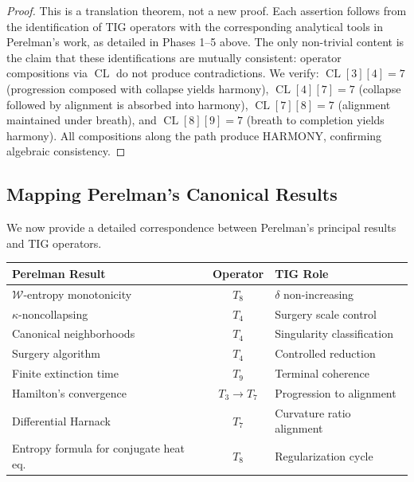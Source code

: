 \documentclass[11pt]{article}
\DeclareMathOperator{\CL}{CL}
\begin{document}
\begin{proof}
This is a translation theorem, not a new proof.  Each assertion
follows from the identification of TIG operators with the corresponding
analytical tools in Perelman's work, as detailed in
Phases 1--5 above.  The only non-trivial content is the claim that
these identifications are mutually consistent: operator compositions
via $\CL$ do not produce contradictions.  We verify:
$\CL[3][4] = 7$ (progression composed with collapse yields harmony),
$\CL[4][7] = 7$ (collapse followed by alignment is absorbed into
harmony), $\CL[7][8] = 7$ (alignment maintained under breath), and
$\CL[8][9] = 7$ (breath to completion yields harmony).  All
compositions along the path produce HARMONY, confirming algebraic
consistency.
\end{proof}

\subsection{Mapping Perelman's Canonical Results}
\label{subsec:poinc-mapping}

We now provide a detailed correspondence between Perelman's principal
results and TIG operators.

\begin{center}
\begin{tabular}{@{}p{5.5cm}cl@{}}
\toprule
Perelman Result & Operator & TIG Role \\
\midrule
$\mathcal{W}$-entropy monotonicity \cite{Per1} & $T_8$ & $\delta$ non-increasing \\
$\kappa$-noncollapsing \cite{Per1} & $T_4$ & Surgery scale control \\
Canonical neighborhoods \cite{Per2} & $T_4$ & Singularity classification \\
Surgery algorithm \cite{Per2} & $T_4$ & Controlled reduction \\
Finite extinction time \cite{Per3} & $T_9$ & Terminal coherence \\
Hamilton's convergence \cite{Ham82} & $T_3 \to T_7$ & Progression to alignment \\
Differential Harnack \cite{Per1} & $T_7$ & Curvature ratio alignment \\
Entropy formula for conjugate heat eq. & $T_8$ & Regularization cycle \\
\bottomrule
\end{tabular}
\end{center}
\end{document}
